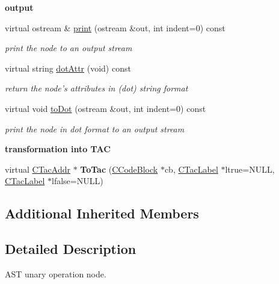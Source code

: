 \begin{Indent}{\bf output}\par
\begin{DoxyCompactItemize}
\item 
virtual ostream \& \hyperlink{classCAstUnaryOp_a870cecc45c81efbd19c678d1d70381f8}{print} (ostream \&out, int indent=0) const 
\begin{DoxyCompactList}\small\item\em print the node to an output stream \end{DoxyCompactList}\item 
virtual string \hyperlink{classCAstUnaryOp_add4c585aa263e4dcc15b624d1f209875}{dot\-Attr} (void) const 
\begin{DoxyCompactList}\small\item\em return the node's attributes in (dot) string format \end{DoxyCompactList}\item 
virtual void \hyperlink{classCAstUnaryOp_a921a731e6ddcc88d34a2f206f73b4057}{to\-Dot} (ostream \&out, int indent=0) const 
\begin{DoxyCompactList}\small\item\em print the node in dot format to an output stream \end{DoxyCompactList}\end{DoxyCompactItemize}
\end{Indent}
\begin{Indent}{\bf transformation into T\-A\-C}\par
\begin{DoxyCompactItemize}
\item 
\hypertarget{classCAstUnaryOp_a4de1f295c6a1212f35e7cf24cd3d69fc}{virtual \hyperlink{classCTacAddr}{C\-Tac\-Addr} $\ast$ {\bfseries To\-Tac} (\hyperlink{classCCodeBlock}{C\-Code\-Block} $\ast$cb, \hyperlink{classCTacLabel}{C\-Tac\-Label} $\ast$ltrue=N\-U\-L\-L, \hyperlink{classCTacLabel}{C\-Tac\-Label} $\ast$lfalse=N\-U\-L\-L)}\label{classCAstUnaryOp_a4de1f295c6a1212f35e7cf24cd3d69fc}

\end{DoxyCompactItemize}
\end{Indent}
\subsection*{Additional Inherited Members}


\subsection{Detailed Description}
A\-S\-T unary operation node. 

